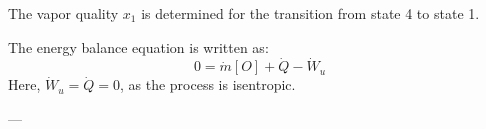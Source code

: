 The vapor quality \( x_1 \) is determined for the transition from state 4 to state 1.  

The energy balance equation is written as:  
\[
0 = \dot{m} \left[ O \right] + \dot{Q} - \dot{W}_u
\]  
Here, \( \dot{W}_u = \dot{Q} = 0 \), as the process is isentropic.  

---